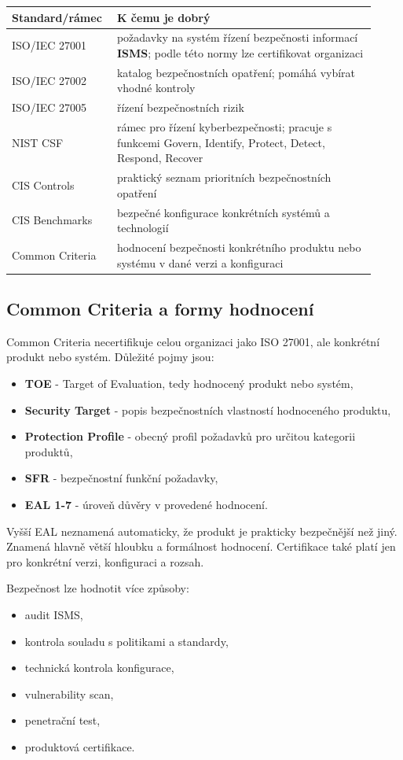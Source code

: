 \documentclass[11pt,a4paper]{article}
\begin{document}
\begin{longtable}{p{0.24\linewidth}p{0.68\linewidth}}
\toprule
\textbf{Standard/rámec} & \textbf{K čemu je dobrý} \\
\midrule\endhead
ISO/IEC 27001 & požadavky na systém řízení bezpečnosti informací \textbf{ISMS}; podle této normy lze certifikovat organizaci \\
ISO/IEC 27002 & katalog bezpečnostních opatření; pomáhá vybírat vhodné kontroly \\
ISO/IEC 27005 & řízení bezpečnostních rizik \\
NIST CSF & rámec pro řízení kyberbezpečnosti; pracuje s funkcemi Govern, Identify, Protect, Detect, Respond, Recover \\
CIS Controls & praktický seznam prioritních bezpečnostních opatření \\
CIS Benchmarks & bezpečné konfigurace konkrétních systémů a technologií \\
Common Criteria & hodnocení bezpečnosti konkrétního produktu nebo systému v dané verzi a konfiguraci \\
\bottomrule
\end{longtable}

\subsection*{Common Criteria a formy hodnocení}

Common Criteria necertifikuje celou organizaci jako ISO 27001, ale konkrétní produkt nebo systém. Důležité pojmy jsou:
\begin{itemize}
    \item \textbf{TOE} - Target of Evaluation, tedy hodnocený produkt nebo systém,
    \item \textbf{Security Target} - popis bezpečnostních vlastností hodnoceného produktu,
    \item \textbf{Protection Profile} - obecný profil požadavků pro určitou kategorii produktů,
    \item \textbf{SFR} - bezpečnostní funkční požadavky,
    \item \textbf{EAL 1-7} - úroveň důvěry v provedené hodnocení.
\end{itemize}

Vyšší EAL neznamená automaticky, že produkt je prakticky bezpečnější než jiný. Znamená hlavně větší hloubku a formálnost hodnocení. Certifikace také platí jen pro konkrétní verzi, konfiguraci a rozsah.

Bezpečnost lze hodnotit více způsoby:
\begin{itemize}
    \item audit ISMS,
    \item kontrola souladu s politikami a standardy,
    \item technická kontrola konfigurace,
    \item vulnerability scan,
    \item penetrační test,
    \item produktová certifikace.
\end{itemize}
\end{document}
